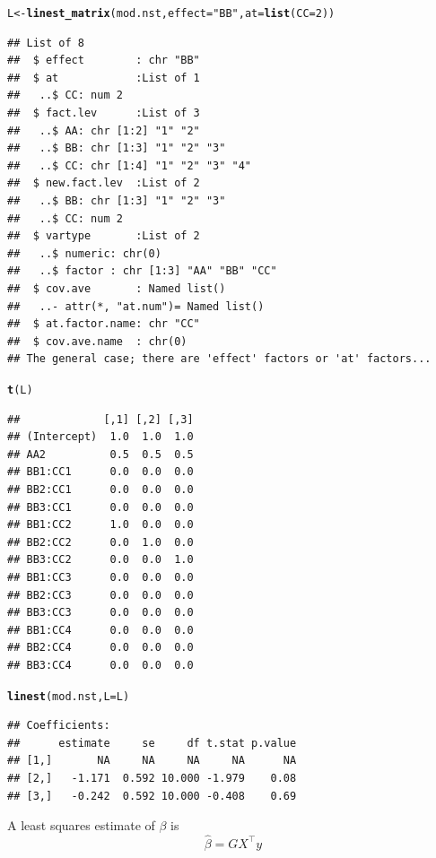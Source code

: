 \documentclass[10pt]{article}\usepackage[]{graphicx}\usepackage[]{color}
\makeatletter
\newcommand{\hlnum}[1]{\textcolor[rgb]{0.686,0.059,0.569}{#1}}%
\newcommand{\hlstr}[1]{\textcolor[rgb]{0.192,0.494,0.8}{#1}}%
\newcommand{\hlstd}[1]{\textcolor[rgb]{0.345,0.345,0.345}{#1}}%
\newcommand{\hlkwb}[1]{\textcolor[rgb]{0.69,0.353,0.396}{#1}}%
\newcommand{\hlkwc}[1]{\textcolor[rgb]{0.333,0.667,0.333}{#1}}%
\newcommand{\hlkwd}[1]{\textcolor[rgb]{0.737,0.353,0.396}{\textbf{#1}}}%
\newenvironment{kframe}{%
 \def\at@end@of@kframe{}%
 \ifinner\ifhmode%
  \def\at@end@of@kframe{\end{minipage}}%
  \begin{minipage}{\columnwidth}%
 \fi\fi%
 \def\FrameCommand##1{\hskip\@totalleftmargin \hskip-\fboxsep
 \colorbox{shadecolor}{##1}\hskip-\fboxsep
     \hskip-\linewidth \hskip-\@totalleftmargin \hskip\columnwidth}%
 \MakeFramed {\advance\hsize-\width
   \@totalleftmargin\z@ \linewidth\hsize
   \@setminipage}}%
 {\par\unskip\endMakeFramed%
 \at@end@of@kframe}
\newenvironment{knitrout}{}{} %
\newcommand{\transp}{^{\top}}
\makeatother
\begin{document}
\begin{knitrout}
\color{fgcolor}\begin{kframe}
\begin{alltt}
\hlstd{L} \hlkwb{<-} \hlkwd{linest_matrix}\hlstd{(mod.nst,} \hlkwc{effect}\hlstd{=}\hlstr{"BB"}\hlstd{,} \hlkwc{at}\hlstd{=}\hlkwd{list}\hlstd{(}\hlkwc{CC}\hlstd{=}\hlnum{2}\hlstd{))}
\end{alltt}
\begin{verbatim}
## List of 8
##  $ effect        : chr "BB"
##  $ at            :List of 1
##   ..$ CC: num 2
##  $ fact.lev      :List of 3
##   ..$ AA: chr [1:2] "1" "2"
##   ..$ BB: chr [1:3] "1" "2" "3"
##   ..$ CC: chr [1:4] "1" "2" "3" "4"
##  $ new.fact.lev  :List of 2
##   ..$ BB: chr [1:3] "1" "2" "3"
##   ..$ CC: num 2
##  $ vartype       :List of 2
##   ..$ numeric: chr(0) 
##   ..$ factor : chr [1:3] "AA" "BB" "CC"
##  $ cov.ave       : Named list()
##   ..- attr(*, "at.num")= Named list()
##  $ at.factor.name: chr "CC"
##  $ cov.ave.name  : chr(0) 
## The general case; there are 'effect' factors or 'at' factors...
\end{verbatim}
\begin{alltt}
\hlkwd{t}\hlstd{(L)}
\end{alltt}
\begin{verbatim}
##             [,1] [,2] [,3]
## (Intercept)  1.0  1.0  1.0
## AA2          0.5  0.5  0.5
## BB1:CC1      0.0  0.0  0.0
## BB2:CC1      0.0  0.0  0.0
## BB3:CC1      0.0  0.0  0.0
## BB1:CC2      1.0  0.0  0.0
## BB2:CC2      0.0  1.0  0.0
## BB3:CC2      0.0  0.0  1.0
## BB1:CC3      0.0  0.0  0.0
## BB2:CC3      0.0  0.0  0.0
## BB3:CC3      0.0  0.0  0.0
## BB1:CC4      0.0  0.0  0.0
## BB2:CC4      0.0  0.0  0.0
## BB3:CC4      0.0  0.0  0.0
\end{verbatim}
\begin{alltt}
\hlkwd{linest}\hlstd{(mod.nst,} \hlkwc{L}\hlstd{=L)}
\end{alltt}
\begin{verbatim}
## Coefficients:
##      estimate     se     df t.stat p.value
## [1,]       NA     NA     NA     NA      NA
## [2,]   -1.171  0.592 10.000 -1.979    0.08
## [3,]   -0.242  0.592 10.000 -0.408    0.69
\end{verbatim}
\end{kframe}
\end{knitrout}

A least squares estimate of $\beta$ is
\begin{displaymath}
  \hat \beta = G X\transp y
\end{displaymath}
\end{document}
